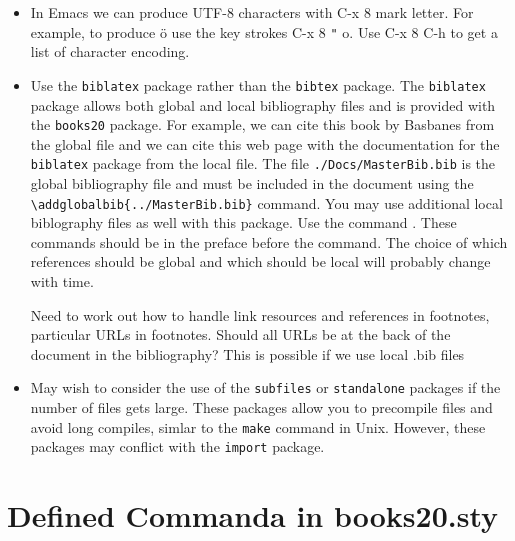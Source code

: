\begin{itemize}
{  This will be useful when I create \LaTeXe\ files from the database
  which is in UTF-8 encoding.
}

\item In Emacs we can produce UTF-8 characters with C-x 8 mark letter.
  For example, to produce ö use the key strokes C-x 8 \verb|"| o. Use C-x 8 C-h
  to get a list of character encoding.
  
\item {Use the \texttt{biblatex} package rather than the
    \texttt{bibtex} package. The \texttt{biblatex} package allows both
    global and local bibliography files and is provided with the
    \texttt{books20} package.  For example, we can cite this book by
    Basbanes \cite{basbanes:2003} from the global file and we can cite
    this web page with the documentation for the \texttt{biblatex}
    package \cite{Lehman2018} from the local file. The file
    \texttt{./Docs/MasterBib.bib} is the global bibliography file and
    must be included in the document using the
    \verb|\addglobalbib{../MasterBib.bib}| command. You may use
    additional local biblography files as well with this package. Use
    the command \verb||. These commands
    should be in the preface before the \verb||
      command. The choice of which references should be global and
      which should be local will probably change with time.

      Need to work out how to handle link resources and references in
      footnotes, particular URLs in footnotes. Should all URLs be at
      the back of the document in the bibliography?  This is possible
      if we use local .bib files }

\item May wish to consider the use of the \texttt{subfiles} or
  \texttt{standalone} packages if the number of files gets
  large. These packages allow you to precompile files and avoid long
  compiles, simlar to the \texttt{make} command in Unix.  However,
  these packages may conflict with the \texttt{import} package.


\end{itemize}

\section{Defined Commanda in books20.sty}


